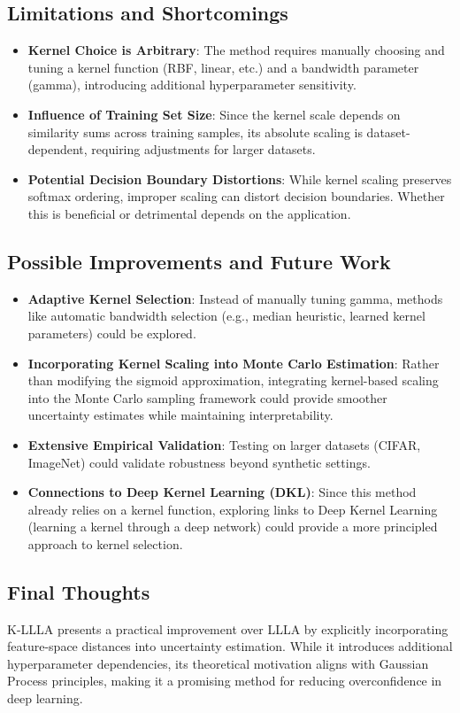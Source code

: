 \documentclass{article}
\begin{document}
\subsection{Limitations and Shortcomings}
\begin{itemize}
    \item \textbf{Kernel Choice is Arbitrary}: The method requires manually choosing and tuning a kernel function (RBF, linear, etc.) and a bandwidth parameter (gamma), introducing additional hyperparameter sensitivity.
    \item \textbf{Influence of Training Set Size}: Since the kernel scale depends on similarity sums across training samples, its absolute scaling is dataset-dependent, requiring adjustments for larger datasets.
    \item \textbf{Potential Decision Boundary Distortions}: While kernel scaling preserves softmax ordering, improper scaling can distort decision boundaries. Whether this is beneficial or detrimental depends on the application.
\end{itemize}

\subsection{Possible Improvements and Future Work}
\begin{itemize}
    \item \textbf{Adaptive Kernel Selection}: Instead of manually tuning gamma, methods like automatic bandwidth selection (e.g., median heuristic, learned kernel parameters) could be explored.
    \item \textbf{Incorporating Kernel Scaling into Monte Carlo Estimation}: Rather than modifying the sigmoid approximation, integrating kernel-based scaling into the Monte Carlo sampling framework could provide smoother uncertainty estimates while maintaining interpretability.
    \item \textbf{Extensive Empirical Validation}: Testing on larger datasets (CIFAR, ImageNet) could validate robustness beyond synthetic settings.
    \item \textbf{Connections to Deep Kernel Learning (DKL)}: Since this method already relies on a kernel function, exploring links to Deep Kernel Learning (learning a kernel through a deep network) could provide a more principled approach to kernel selection.
\end{itemize}

\subsection{Final Thoughts}
K-LLLA presents a practical improvement over LLLA by explicitly incorporating feature-space distances into uncertainty estimation. While it introduces additional hyperparameter dependencies, its theoretical motivation aligns with Gaussian Process principles, making it a promising method for reducing overconfidence in deep learning.
\end{document}
